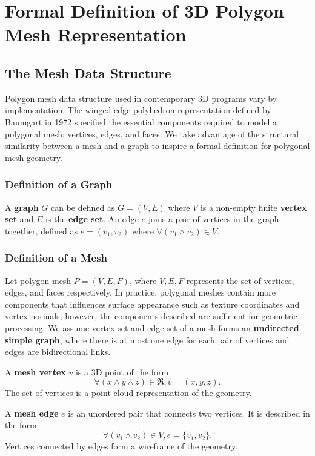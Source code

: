 \documentclass[ %
author={Dillon Keith Diep},
supervisor={Dr. Carl Henrik Ek},
degree={MEng},
title={ART-CG:},
subtitle={Assisted Real-time Content Generation of 3D Hair by Learning Manifolds},
type={Research},
year={2017} ]{dissertation}
\begin{document}
\section{Formal Definition of 3D Polygon Mesh Representation}

\subsection{The Mesh Data Structure}
Polygon mesh data structure used in contemporary 3D programs vary by implementation. The winged-edge polyhedron representation defined by Baumgart in 1972 \cite{wingededge} specified the essential components required to model a polygonal mesh: vertices, edges, and faces. We take advantage of the structural similarity between a mesh and a graph to inspire a formal definition for polygonal mesh geometry.

\subsubsection{Definition of a Graph}
A \textbf{graph} $G$ can be defined as $G=(V,E)$ where $V$ is a non-empty finite \textbf{vertex set} and $E$ is the \textbf{edge set}. \cite[p.8]{graphtheory} An edge $e$ joins a pair of vertices in the graph together, defined as $e=(v_1, v_2)$ where $\forall(v_1 \land v_2)\in V$.

\subsubsection{Definition of a Mesh}
Let polygon mesh $P = (V, E, F)$, where $V, E, F$ represents the set of vertices, edges, and faces respectively. In practice, polygonal meshes contain more components that influences surface appearance such as texture coordinates and vertex normals, however, the components described are sufficient for geometric processing. We assume vertex set and edge set of a mesh forms an \textbf{undirected simple graph}, where there is at most one edge for each pair of vertices and edges are bidirectional links.

A \textbf{mesh vertex} $v$ is a 3D point of the form
$$\forall (x \land y \land z) \in \Re, v = (x, y, z).$$
The set of vertices is a point cloud representation of the geometry. 

A \textbf{mesh edge} $e$ is an unordered pair that connects two vertices. It is described in the form
$$\forall (v_1 \land v_2) \in V, e = \{v_1, v_2\}.$$
Vertices connected by edges form a wireframe of the geometry. 
\end{document}
